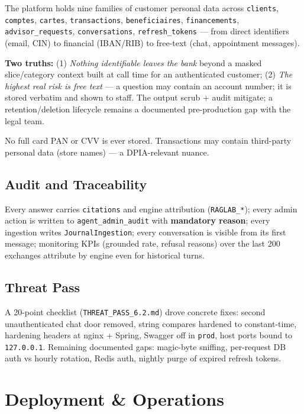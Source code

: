 \documentclass[a4paper,12pt]{report}
\begin{document}
The platform holds nine families of customer personal data across \texttt{clients}, \texttt{comptes}, \texttt{cartes}, \texttt{transactions}, \texttt{beneficiaires}, \texttt{financements}, \texttt{advisor\_requests}, \texttt{conversations}, \texttt{refresh\_tokens} --- from direct identifiers (email, CIN) to financial (IBAN/RIB) to free-text (chat, appointment messages).

\noindent\textbf{Two truths:} (1) \textit{Nothing identifiable leaves the bank} beyond a masked slice/category context built at call time for an authenticated customer; (2) \textit{The highest real risk is free text} --- a question may contain an account number; it is stored verbatim and shown to staff. The output scrub + audit mitigate; a retention/deletion lifecycle remains a documented pre-production gap with the legal team.

\noindent No full card PAN or CVV is ever stored. Transactions may contain third-party personal data (store names) --- a DPIA-relevant nuance.

\section{Audit and Traceability}

Every answer carries \texttt{citations} and engine attribution (\texttt{RAGLAB\_*}); every admin action is written to \texttt{agent\_admin\_audit} with \textbf{mandatory reason}; every ingestion writes \texttt{JournalIngestion}; every conversation is visible from its first message; monitoring KPIs (grounded rate, refusal reasons) over the last 200 exchanges attribute by engine even for historical turns.

\section{Threat Pass}

A 20-point checklist (\texttt{THREAT\_PASS\_6.2.md}) drove concrete fixes: second unauthenticated chat door removed, string compares hardened to constant-time, hardening headers at nginx + Spring, Swagger off in \texttt{prod}, host ports bound to \texttt{127.0.0.1}. Remaining documented gaps: magic-byte sniffing, per-request DB auth vs hourly rotation, Redis auth, nightly purge of expired refresh tokens.

\chapter{Deployment \& Operations}
\end{document}
